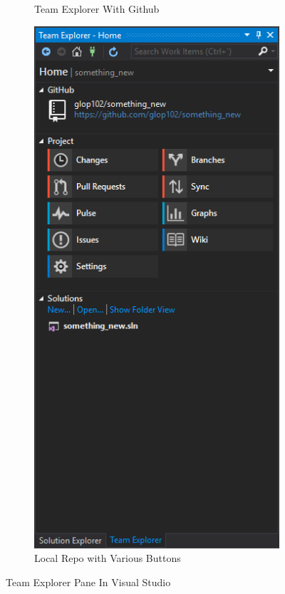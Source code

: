 \documentclass[12pt]{article}
\begin{document}
\begin{figure}[!ht]
\begin{subfigure}[t]{0.45\textwidth}
		\caption{Team Explorer With Github}
	\end{subfigure}
	\begin{subfigure}[t]{0.45\textwidth}
		\includegraphics[width=\textwidth]{github_repo.png}
		\caption{Local Repo with Various Buttons}
		\label{fig:repo_buttons}
	\end{subfigure}
	\caption{Team Explorer Pane In Visual Studio}
	\label{fig:team_explorer}
\end{figure}
\end{document}
